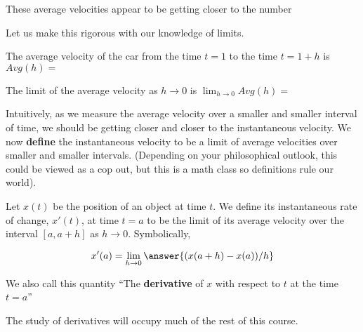 \documentclass{ximera}
\begin{document}
\begin{question}
	These average velocities appear to be getting closer to the number \answer{}
\end{question}

	Let us make this rigorous with our knowledge of limits.  

\begin{question}
	The average velocity of the car from the time $t=1$ to the time $t=1+h$ is $Avg(h)=$ \answer{}
\end{question}

\begin{question}
	The limit of the average velocity as $h \to 0$ is $\lim_{h \to 0} Avg(h) =$\answer{}
\end{question}

Intuitively, as we measure the average velocity over a smaller and smaller interval of time, we should be getting closer and closer to the instantaneous velocity.  We now \textbf{define} the instantaneous velocity to be a limit of average velocities over smaller and smaller intervals.  (Depending on your philosophical outlook, this could be viewed as a cop out, but this is a math class so definitions rule our world). 

\begin{question}
	Let  $x(t)$ be the position of an object at time $t$.  We define its instantaneous rate of change, $x'(t)$, at time $t=a$ to be the limit of its average velocity over the interval $[a,a+h]$ as $h \to 0$.  Symbolically,
	
	\[
	x'(a) = \lim_{h \to 0} \answer{(x(a+h)-x(a))/h}
	\]
	
	We also call this quantity ``The \textbf{derivative} of $x$ with respect to $t$ at the time $t=a$''
\end{question}

The study of derivatives will occupy much of the rest of this course.
\end{document}
